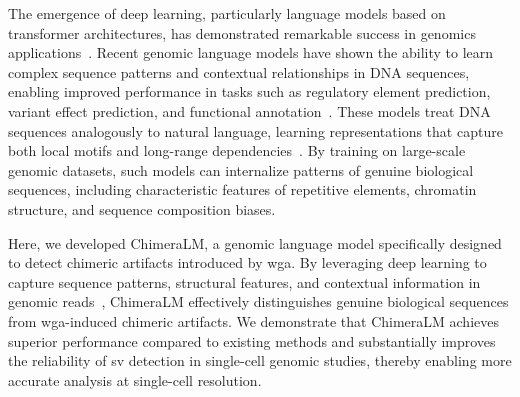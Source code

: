 \documentclass[pdflatex,sn-nature,lineno]{sn-jnl}%
\theoremstyle{thmstyleone}%
\theoremstyle{thmstyletwo}%
\theoremstyle{thmstylethree}%
\begin{document}
The emergence of deep learning, particularly language models based on transformer architectures, has demonstrated remarkable success in genomics applications~\cite{dalla2025nucleotide,zhou2023dnabert,nguyen2023hyenadna, consens2023transformers}.
Recent genomic language models have shown the ability to learn complex sequence patterns and contextual relationships in DNA sequences, enabling improved performance in tasks such as regulatory element prediction, variant effect prediction, and functional annotation~\cite{consens2023transformers,routhier2022genomics}.
These models treat DNA sequences analogously to natural language, learning representations that capture both local motifs and long-range dependencies~\cite{dalla2025nucleotide}.
By training on large-scale genomic datasets, such models can internalize patterns of genuine biological sequences, including characteristic features of repetitive elements, chromatin structure, and sequence composition biases.

Here, we developed ChimeraLM, a genomic language model specifically designed to detect chimeric artifacts introduced by \gls{wga}.
By leveraging deep learning to capture sequence patterns, structural features, and contextual information in genomic reads~\cite{dalla2025nucleotide,zhou2023dnabert,nguyen2023hyenadna,consens2023transformers}, ChimeraLM effectively distinguishes genuine biological sequences from \gls{wga}-induced chimeric artifacts.
We demonstrate that ChimeraLM achieves superior performance compared to existing methods and substantially improves the reliability of \gls{sv} detection in single-cell genomic studies, thereby enabling more accurate analysis at single-cell resolution.
\end{document}
